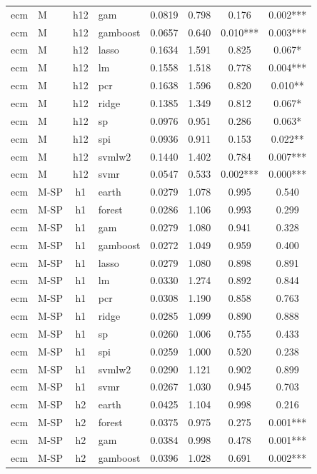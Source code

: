 \begin{ThreePartTable}
\begin{longtable}[t]{llclcccc}
ecm & M & h12 & gam & 0.0819 & 0.798 & 0.176 & 0.002***\\
ecm & M & h12 & gamboost & 0.0657 & 0.640 & 0.010*** & 0.003***\\
ecm & M & h12 & lasso & 0.1634 & 1.591 & 0.825 & 0.067*\\
ecm & M & h12 & lm & 0.1558 & 1.518 & 0.778 & 0.004***\\
ecm & M & h12 & pcr & 0.1638 & 1.596 & 0.820 & 0.010**\\
ecm & M & h12 & ridge & 0.1385 & 1.349 & 0.812 & 0.067*\\
ecm & M & h12 & sp & 0.0976 & 0.951 & 0.286 & 0.063*\\
ecm & M & h12 & spi & 0.0936 & 0.911 & 0.153 & 0.022**\\
ecm & M & h12 & svmlw2 & 0.1440 & 1.402 & 0.784 & 0.007***\\
ecm & M & h12 & svmr & 0.0547 & 0.533 & 0.002*** & 0.000***\\
\addlinespace
ecm & M-SP & h1 & earth & 0.0279 & 1.078 & 0.995 & 0.540\\
ecm & M-SP & h1 & forest & 0.0286 & 1.106 & 0.993 & 0.299\\
ecm & M-SP & h1 & gam & 0.0279 & 1.080 & 0.941 & 0.328\\
ecm & M-SP & h1 & gamboost & 0.0272 & 1.049 & 0.959 & 0.400\\
ecm & M-SP & h1 & lasso & 0.0279 & 1.080 & 0.898 & 0.891\\
ecm & M-SP & h1 & lm & 0.0330 & 1.274 & 0.892 & 0.844\\
ecm & M-SP & h1 & pcr & 0.0308 & 1.190 & 0.858 & 0.763\\
ecm & M-SP & h1 & ridge & 0.0285 & 1.099 & 0.890 & 0.888\\
ecm & M-SP & h1 & sp & 0.0260 & 1.006 & 0.755 & 0.433\\
ecm & M-SP & h1 & spi & 0.0259 & 1.000 & 0.520 & 0.238\\
ecm & M-SP & h1 & svmlw2 & 0.0290 & 1.121 & 0.902 & 0.899\\
ecm & M-SP & h1 & svmr & 0.0267 & 1.030 & 0.945 & 0.703\\
\addlinespace
ecm & M-SP & h2 & earth & 0.0425 & 1.104 & 0.998 & 0.216\\
ecm & M-SP & h2 & forest & 0.0375 & 0.975 & 0.275 & 0.001***\\
ecm & M-SP & h2 & gam & 0.0384 & 0.998 & 0.478 & 0.001***\\
ecm & M-SP & h2 & gamboost & 0.0396 & 1.028 & 0.691 & 0.002***\\

\end{longtable}
\end{ThreePartTable}
